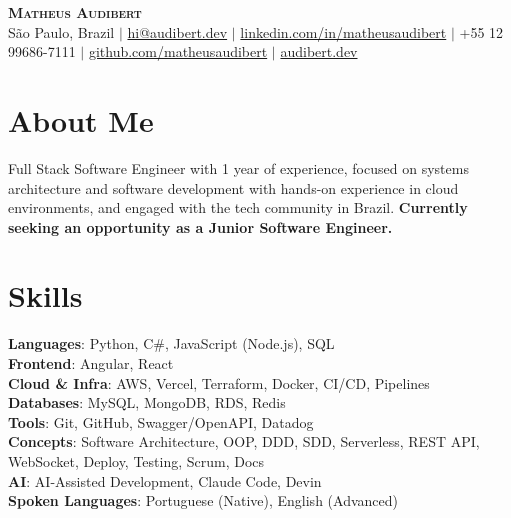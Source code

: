 \documentclass[letterpaper,11pt]{article}
\begin{document}
\begin{center}
    {\Huge \scshape \textcolor{AccentColor}{\textbf{Matheus Audibert}}} \\ \vspace{1pt}
    \small
    São Paulo, Brazil $|$
    \href{mailto:hi@audibert.dev}{hi@audibert.dev} $|$
    \href{https://www.linkedin.com/in/matheusaudibert}{linkedin.com/in/matheusaudibert} $|$
    +55 12 99686-7111 $|$
    \href{https://github.com/matheusaudibert}{github.com/matheusaudibert} $|$
    \href{https://audibert.dev}{audibert.dev}
\end{center}

\section{About Me}
\begin{itemize}[leftmargin=0.15in, label={}]
\small{\item{
Full Stack Software Engineer with 1 year of experience, focused on systems architecture and software development with hands-on experience in cloud environments, and engaged with the tech community in Brazil. \textbf{Currently seeking an opportunity as a Junior Software Engineer.}
}}
\end{itemize}

\section{Skills}
\begin{itemize}[leftmargin=0.15in, label={}]
\small{\item{
\textbf{Languages}: Python, C\#, JavaScript (Node.js), SQL \\
\textbf{Frontend}: Angular, React \\
\textbf{Cloud \& Infra}: AWS, Vercel, Terraform, Docker, CI/CD, Pipelines \\
\textbf{Databases}: MySQL, MongoDB, RDS, Redis \\
\textbf{Tools}: Git, GitHub, Swagger/OpenAPI, Datadog \\
\textbf{Concepts}: Software Architecture, OOP, DDD, SDD, Serverless, REST API, WebSocket, Deploy, Testing, Scrum, Docs \\
\textbf{AI}: AI-Assisted Development, Claude Code, Devin \\
\textbf{Spoken Languages}: Portuguese (Native), English (Advanced)
}}
\end{itemize}
\end{document}

